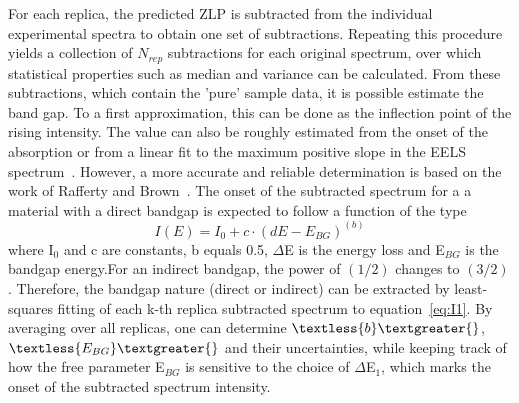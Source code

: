 %
For each replica, the predicted ZLP is subtracted from the individual 
experimental spectra to obtain one set of subtractions. 
Repeating this procedure yields a collection of $N_{rep}$ subtractions 
for each original spectrum, over which statistical properties such as 
median and variance can be calculated.\newline
%
From these subtractions, which contain the 'pure' sample data, 
it is possible estimate the band gap. To a first approximation,
this can be done as the inflection point of the rising intensity.
%
The value can also be roughly estimated from the onset of the absorption 
or from a linear fit to the maximum positive slope in the 
EELS spectrum~\cite{Schamm:2003}. 
%
However, a more accurate and reliable determination is based on the work of 
Rafferty and Brown~\cite{Rafferty:2000}. The onset of the subtracted spectrum 
for a a material with a direct bandgap is expected to follow a function of the type
\begin{equation}\label{eq:I1}
    I(E) = I_0 + c\cdot(dE-E_{BG})^{(b)}
\end{equation}
where I$_0$ and c are constants, b equals 0.5, $\Delta$E is the energy loss and E$_{BG}$ 
is the bandgap energy.For an indirect bandgap, the power of $(1/2)$ changes to $(3/2)$. 
%
Therefore, the bandgap nature (direct or indirect) can be extracted by 
least-squares fitting of each k-th replica subtracted spectrum to equation~\ref{eq:I1}.
%
By averaging over all replicas, one can determine $\textless{b}\textgreater{}$, 
$\textless{E_{BG}}\textgreater{}$ 
and their uncertainties, while keeping track of how the free parameter
E$_{BG}$ is sensitive to the choice of $\Delta$E$_1$, which marks the onset
of the subtracted spectrum intensity.
%


